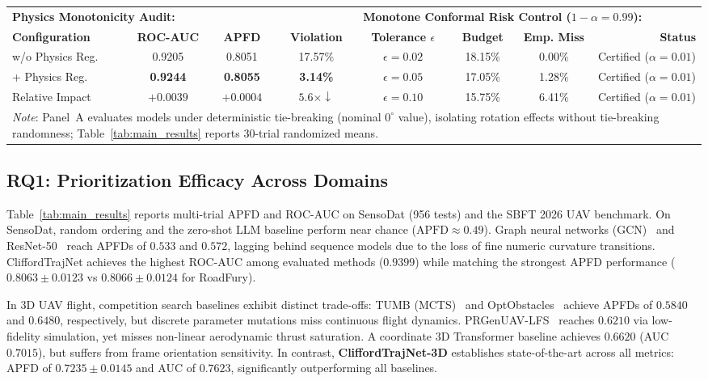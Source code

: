 \begin{table}[t]
{\begin{tabular}{lccccccr}
\midrule
\multicolumn{4}{l}{\textbf{Physics Monotonicity Audit:}} & \multicolumn{4}{l}{\textbf{Monotone Conformal Risk Control ($1-\alpha=0.99$):}} \\
\cmidrule(lr){1-4} \cmidrule(lr){5-8}
\textbf{Configuration} & \textbf{ROC-AUC} & \textbf{APFD} & \textbf{Violation} & \textbf{Tolerance $\epsilon$} & \textbf{Budget} & \textbf{Emp. Miss} & \textbf{Status} \\
\midrule
w/o Physics Reg. & 0.9205 & 0.8051 & 17.57\% & $\epsilon = 0.02$ & 18.15\% & 0.00\% & Certified ($\alpha = 0.01$) \\
+ Physics Reg. & \textbf{0.9244} & \textbf{0.8055} & \textbf{3.14\%} & $\epsilon = 0.05$ & 17.05\% & 1.28\% & Certified ($\alpha = 0.01$) \\
Relative Impact & $+0.0039$ & $+0.0004$ & $5.6\times\downarrow$ & $\epsilon = 0.10$ & 15.75\% & 6.41\% & Certified ($\alpha = 0.01$) \\
\bottomrule
\multicolumn{8}{l}{\footnotesize \textit{Note}: Panel~A evaluates models under deterministic tie-breaking (nominal $0^\circ$ value), isolating rotation effects without tie-breaking randomness; Table~\ref{tab:main_results} reports 30-trial randomized means.} \\
\end{tabular}%
}
\end{table}

\enlargethispage{4\baselineskip}
\subsection{RQ1: Prioritization Efficacy Across Domains}

Table~\ref{tab:main_results} reports multi-trial APFD and ROC-AUC on SensoDat (956 tests) and the SBFT 2026 UAV benchmark.
On SensoDat, random ordering and the zero-shot LLM baseline perform near chance ($\mathrm{APFD} \approx 0.49$).
Graph neural networks (GCN)~\cite{gcn} and ResNet-50~\cite{resnet} reach APFDs of $0.533$ and $0.572$, lagging behind sequence models due to the loss of fine numeric curvature transitions.
CliffordTrajNet achieves the highest ROC-AUC among evaluated methods ($\mathbf{0.9399}$) while matching the strongest APFD performance ($0.8063 \pm 0.0123$ vs $0.8066 \pm 0.0124$ for RoadFury).

In 3D UAV flight, competition search baselines exhibit distinct trade-offs:
TUMB (MCTS)~\cite{tumb} and OptObstacles~\cite{optobstacles} achieve APFDs of $0.5840$ and $0.6480$, respectively, but discrete parameter mutations miss continuous flight dynamics.
PRGenUAV-LFS~\cite{uavcomp} reaches $0.6210$ via low-fidelity simulation, yet misses non-linear aerodynamic thrust saturation.
A coordinate 3D Transformer baseline achieves $0.6620$ (AUC $0.7015$), but suffers from frame orientation sensitivity.
In contrast, \textbf{CliffordTrajNet-3D} establishes state-of-the-art across all metrics: APFD of \textbf{$0.7235 \pm 0.0145$} and AUC of \textbf{$0.7623$}, significantly outperforming all baselines.

